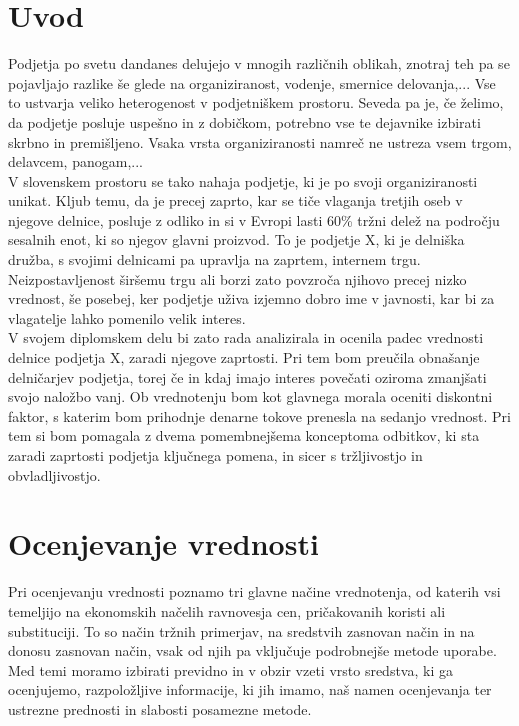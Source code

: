 \documentclass[12pt,a4paper]{amsart}
\theoremstyle{definition} %
\theoremstyle{plain} %
\begin{document}
\section{Uvod}
Podjetja po svetu dandanes delujejo v mnogih različnih oblikah, znotraj teh pa se pojavljajo razlike še glede na organiziranost, vodenje, smernice delovanja,... Vse to ustvarja veliko heterogenost v podjetniškem prostoru. Seveda pa je, če želimo, da podjetje posluje uspešno in z dobičkom, potrebno vse te dejavnike izbirati skrbno in premišljeno. Vsaka vrsta organiziranosti namreč ne ustreza vsem trgom, delavcem, panogam,... \\
V slovenskem prostoru se tako nahaja podjetje, ki je po svoji organiziranosti unikat. Kljub temu, da je precej zaprto, kar se tiče vlaganja tretjih oseb v njegove delnice, posluje z odliko in si v Evropi lasti 60\% tržni delež na področju sesalnih enot, ki so njegov glavni proizvod. To je podjetje X, ki je delniška družba, s svojimi delnicami pa upravlja na zaprtem, internem trgu. Neizpostavljenost širšemu trgu ali borzi zato povzroča njihovo precej nizko vrednost, še posebej, ker podjetje uživa izjemno dobro ime v javnosti, kar bi za vlagatelje lahko pomenilo velik interes.\\
V svojem diplomskem delu bi zato rada analizirala in ocenila padec vrednosti delnice podjetja X, zaradi njegove zaprtosti. Pri tem bom preučila obnašanje delničarjev podjetja, torej če in kdaj imajo interes povečati oziroma zmanjšati svojo naložbo vanj. Ob vrednotenju bom kot glavnega morala oceniti diskontni faktor, s katerim bom prihodnje denarne tokove prenesla na sedanjo vrednost. Pri tem si bom pomagala z dvema pomembnejšema konceptoma odbitkov, ki sta zaradi zaprtosti podjetja ključnega pomena, in sicer s tržljivostjo in obvladljivostjo.
\newpage







\section{Ocenjevanje vrednosti}
Pri ocenjevanju vrednosti poznamo tri glavne načine vrednotenja, od katerih vsi temeljijo na ekonomskih načelih ravnovesja cen, pričakovanih koristi ali substituciji. To so način tržnih primerjav, na sredstvih zasnovan način in na donosu zasnovan način, vsak od njih pa vključuje podrobnejše metode uporabe. Med temi moramo izbirati previdno in v obzir vzeti vrsto sredstva, ki ga ocenjujemo, razpoložljive informacije, ki jih imamo, naš namen ocenjevanja ter ustrezne prednosti in slabosti posamezne metode. 
\end{document}
